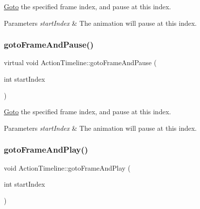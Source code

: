 \hyperlink{classGoto}{Goto} the specified frame index, and pause at this index. 
\begin{DoxyParams}{Parameters}
{\em start\+Index} & The animation will pause at this index. \\
\hline
\end{DoxyParams}
\mbox{\label{classActionTimeline_a6ab7b14ad833b3382503236c07933d13}} 
\subsubsection{\texorpdfstring{goto\+Frame\+And\+Pause()}{gotoFrameAndPause()}\hspace{0.1cm}{\footnotesize\ttfamily [2/2]}}
{\footnotesize\ttfamily virtual void Action\+Timeline\+::goto\+Frame\+And\+Pause (\begin{DoxyParamCaption}\item[{int}]{start\+Index }\end{DoxyParamCaption})\hspace{0.3cm}{\ttfamily [virtual]}}

\hyperlink{classGoto}{Goto} the specified frame index, and pause at this index. 
\begin{DoxyParams}{Parameters}
{\em start\+Index} & The animation will pause at this index. \\
\hline
\end{DoxyParams}
\mbox{\label{classActionTimeline_a4238a481e46b75754dd011dfd89844fd}} 
\subsubsection{\texorpdfstring{goto\+Frame\+And\+Play()}{gotoFrameAndPlay()}\hspace{0.1cm}{\footnotesize\ttfamily [1/8]}}
{\footnotesize\ttfamily void Action\+Timeline\+::goto\+Frame\+And\+Play (\begin{DoxyParamCaption}\item[{int}]{start\+Index }\end{DoxyParamCaption})\hspace{0.3cm}{\ttfamily [virtual]}}

